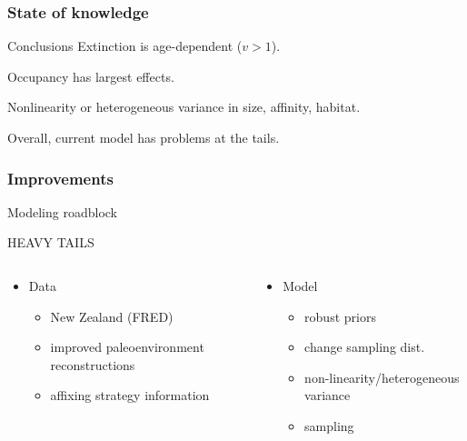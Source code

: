 \documentclass{beamer}
\begin{document}
\begin{frame}
  \frametitle{State of knowledge}

  \begin{block}{Conclusions}
    Extinction is age-dependent (\(v > 1\)).

    Occupancy has largest effects.

    Nonlinearity or heterogeneous variance in size, affinity, habitat.

    Overall, current model has problems at the tails.
  \end{block}
\end{frame}


\begin{frame}
  \frametitle{Improvements}

  \begin{alertblock}{Modeling roadblock}
    \begin{center}
    HEAVY TAILS
    \end{center}
  \end{alertblock}

  \bigskip

  \begin{columns}
    \begin{column}{0.5\textwidth}
      \begin{itemize}
        \item Data
          \begin{itemize}
            \item New Zealand (FRED)
            \item improved paleoenvironment reconstructions
            \item affixing strategy information
          \end{itemize}
      \end{itemize}
    \end{column}
    \begin{column}{0.5\textwidth}
      \begin{itemize}
        \item Model
          \begin{itemize}
            \item robust priors
            \item change sampling dist.
            \item non-linearity/heterogeneous variance
            \item sampling 
          \end{itemize}
      \end{itemize}
    \end{column}
  \end{columns}
\end{frame}
\end{document}
